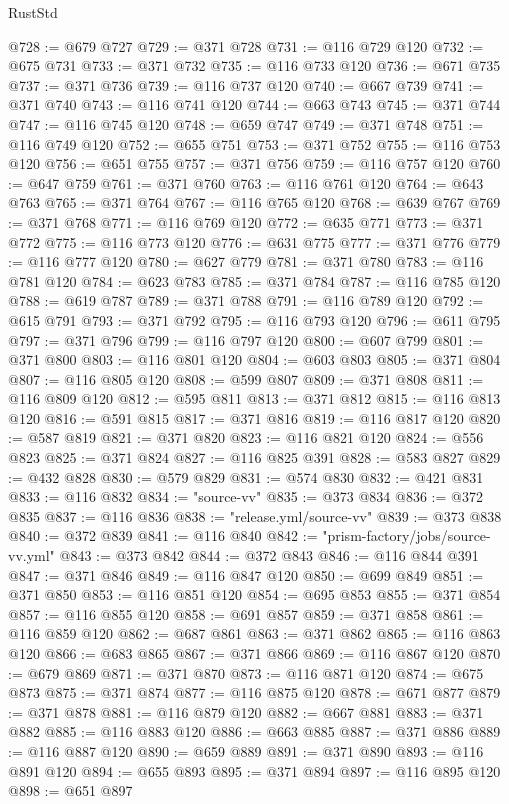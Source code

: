 \begin{lexlean}{RustStd}
\begin{coremodule}
@728 := @679 @727
@729 := @371 @728
@731 := @116 @729 @120
@732 := @675 @731
@733 := @371 @732
@735 := @116 @733 @120
@736 := @671 @735
@737 := @371 @736
@739 := @116 @737 @120
@740 := @667 @739
@741 := @371 @740
@743 := @116 @741 @120
@744 := @663 @743
@745 := @371 @744
@747 := @116 @745 @120
@748 := @659 @747
@749 := @371 @748
@751 := @116 @749 @120
@752 := @655 @751
@753 := @371 @752
@755 := @116 @753 @120
@756 := @651 @755
@757 := @371 @756
@759 := @116 @757 @120
@760 := @647 @759
@761 := @371 @760
@763 := @116 @761 @120
@764 := @643 @763
@765 := @371 @764
@767 := @116 @765 @120
@768 := @639 @767
@769 := @371 @768
@771 := @116 @769 @120
@772 := @635 @771
@773 := @371 @772
@775 := @116 @773 @120
@776 := @631 @775
@777 := @371 @776
@779 := @116 @777 @120
@780 := @627 @779
@781 := @371 @780
@783 := @116 @781 @120
@784 := @623 @783
@785 := @371 @784
@787 := @116 @785 @120
@788 := @619 @787
@789 := @371 @788
@791 := @116 @789 @120
@792 := @615 @791
@793 := @371 @792
@795 := @116 @793 @120
@796 := @611 @795
@797 := @371 @796
@799 := @116 @797 @120
@800 := @607 @799
@801 := @371 @800
@803 := @116 @801 @120
@804 := @603 @803
@805 := @371 @804
@807 := @116 @805 @120
@808 := @599 @807
@809 := @371 @808
@811 := @116 @809 @120
@812 := @595 @811
@813 := @371 @812
@815 := @116 @813 @120
@816 := @591 @815
@817 := @371 @816
@819 := @116 @817 @120
@820 := @587 @819
@821 := @371 @820
@823 := @116 @821 @120
@824 := @556 @823
@825 := @371 @824
@827 := @116 @825 @391
@828 := @583 @827
@829 := @432 @828
@830 := @579 @829
@831 := @574 @830
@832 := @421 @831
@833 := @116 @832
@834 := "source-vv"
@835 := @373 @834
@836 := @372 @835
@837 := @116 @836
@838 := "release.yml/source-vv"
@839 := @373 @838
@840 := @372 @839
@841 := @116 @840
@842 := "prism-factory/jobs/source-vv.yml"
@843 := @373 @842
@844 := @372 @843
@846 := @116 @844 @391
@847 := @371 @846
@849 := @116 @847 @120
@850 := @699 @849
@851 := @371 @850
@853 := @116 @851 @120
@854 := @695 @853
@855 := @371 @854
@857 := @116 @855 @120
@858 := @691 @857
@859 := @371 @858
@861 := @116 @859 @120
@862 := @687 @861
@863 := @371 @862
@865 := @116 @863 @120
@866 := @683 @865
@867 := @371 @866
@869 := @116 @867 @120
@870 := @679 @869
@871 := @371 @870
@873 := @116 @871 @120
@874 := @675 @873
@875 := @371 @874
@877 := @116 @875 @120
@878 := @671 @877
@879 := @371 @878
@881 := @116 @879 @120
@882 := @667 @881
@883 := @371 @882
@885 := @116 @883 @120
@886 := @663 @885
@887 := @371 @886
@889 := @116 @887 @120
@890 := @659 @889
@891 := @371 @890
@893 := @116 @891 @120
@894 := @655 @893
@895 := @371 @894
@897 := @116 @895 @120
@898 := @651 @897

\end{coremodule}
\end{lexlean}
